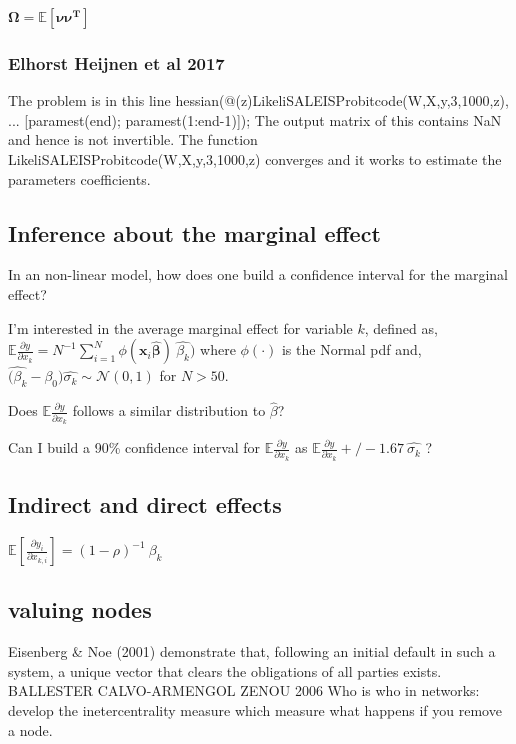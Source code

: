 \documentclass[11pt,final]{article}%
\newcommand{\vect}[1]{\bm{#1}} %
\begin{document}
$ \bm{\Omega} = \mathbb{E} \left[ \bm{\nu} \bm{\nu^{T}} \right]$


\subsubsection{Elhorst Heijnen et al 2017}
The problem is in this line
hessian(@(z)LikeliSALEISProbitcode(W,X,y,3,1000,z), ...
            [paramest(end); paramest(1:end-1)]);
The output matrix of this contains NaN and hence is not invertible. The function LikeliSALEISProbitcode(W,X,y,3,1000,z) converges and it works to estimate the parameters coefficients. 

\subsection{Inference about the marginal effect}

In an non-linear model, how does one build a confidence interval for the marginal effect?

I’m interested in the average marginal effect for variable $k$, defined as,  $\mathbb{E} \frac{\partial y}{\partial x_{k}} = N^{-1} \sum_{i=1}^{N} \phi(\vect{x}_{i} \vect{\hat{\beta}}) \: \hat{\beta_{k}})$ where $\phi(\cdot)$ is the Normal pdf and, $\hat{( \beta_{k}} - \beta_{0})\hat{\sigma_{k}} \sim \mathcal{N}(0,1)$ for $N>50$. 

Does $\mathbb{E} \frac{\partial y}{\partial x_{k}}$ follows a similar distribution to $\hat{\beta}$?

Can I build a 90\% confidence interval for $\mathbb{E} \frac{\partial y}{\partial x_{k}}$ as $\mathbb{E} \frac{\partial y}{\partial x_{k}} +/- 1.67 \: \hat{\sigma_{k}}$ ?

\subsection{Indirect and direct effects}
$ \mathbb{E} \left[ \frac{\partial y_{i}}{\partial x_{k, i}} \right] = (1-\rho)^{-1} \: \beta_{k}$

\subsection{valuing nodes}
Eisenberg & Noe (2001) demonstrate that, following an initial default in such a system, a unique vector that clears the obligations of all parties exists.
BALLESTER CALVO-ARMENGOL ZENOU 2006 Who is who in networks: develop the inetercentrality measure which measure what happens if you remove a node.
\end{document}
